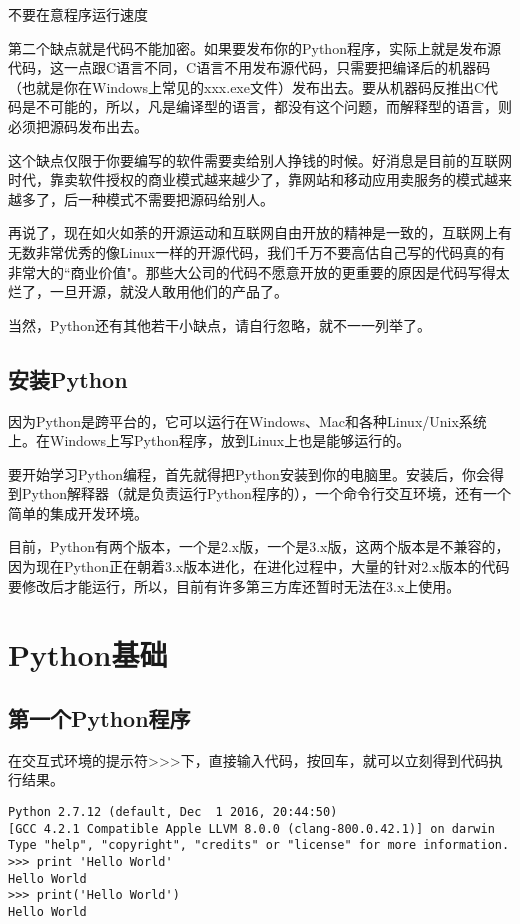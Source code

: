 \documentclass[10pt,a4paper]{ctexbook}
\begin{document}
不要在意程序运行速度

第二个缺点就是代码不能加密。如果要发布你的Python程序，实际上就是发布源代码，这一点跟C语言不同，C语言不用发布源代码，只需要把编译后的机器码（也就是你在Windows上常见的xxx.exe文件）发布出去。要从机器码反推出C代码是不可能的，所以，凡是编译型的语言，都没有这个问题，而解释型的语言，则必须把源码发布出去。

这个缺点仅限于你要编写的软件需要卖给别人挣钱的时候。好消息是目前的互联网时代，靠卖软件授权的商业模式越来越少了，靠网站和移动应用卖服务的模式越来越多了，后一种模式不需要把源码给别人。

再说了，现在如火如荼的开源运动和互联网自由开放的精神是一致的，互联网上有无数非常优秀的像Linux一样的开源代码，我们千万不要高估自己写的代码真的有非常大的``商业价值"。那些大公司的代码不愿意开放的更重要的原因是代码写得太烂了，一旦开源，就没人敢用他们的产品了。

当然，Python还有其他若干小缺点，请自行忽略，就不一一列举了。

\subsection{安装Python}
因为Python是跨平台的，它可以运行在Windows、Mac和各种Linux/Unix系统上。在Windows上写Python程序，放到Linux上也是能够运行的。

要开始学习Python编程，首先就得把Python安装到你的电脑里。安装后，你会得到Python解释器（就是负责运行Python程序的），一个命令行交互环境，还有一个简单的集成开发环境。

目前，Python有两个版本，一个是2.x版，一个是3.x版，这两个版本是不兼容的，因为现在Python正在朝着3.x版本进化，在进化过程中，大量的针对2.x版本的代码要修改后才能运行，所以，目前有许多第三方库还暂时无法在3.x上使用。

\section{Python基础}
\subsection{第一个Python程序}
在交互式环境的提示符>>>下，直接输入代码，按回车，就可以立刻得到代码执行结果。
\begin{verbatim}
Python 2.7.12 (default, Dec  1 2016, 20:44:50) 
[GCC 4.2.1 Compatible Apple LLVM 8.0.0 (clang-800.0.42.1)] on darwin
Type "help", "copyright", "credits" or "license" for more information.
>>> print 'Hello World'
Hello World
>>> print('Hello World')
Hello World
\end{verbatim}
\end{document}
